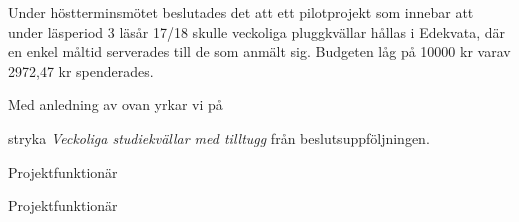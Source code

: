 \documentclass[../_main/handlingar.tex]{subfiles}
\begin{document}

Under höstterminsmötet beslutades det att ett pilotprojekt som innebar att under läsperiod 3
läsår 17/18 skulle veckoliga pluggkvällar hållas i Edekvata, där en enkel måltid serverades
till de som anmält sig. Budgeten låg på 10000 kr varav 2972,47 kr spenderades.

Med anledning av ovan yrkar vi på

\begin{attsatser}
    \att stryka \emph{Veckoliga studiekvällar med tilltugg} från beslutsuppföljningen.
\end{attsatser}

\begin{signatures}{2}
    \mvh
    \signature{William Marnfeldt}{Projektfunktionär}
    \signature{Filip Larsson}{Projektfunktionär}
\end{signatures}
\end{document}
